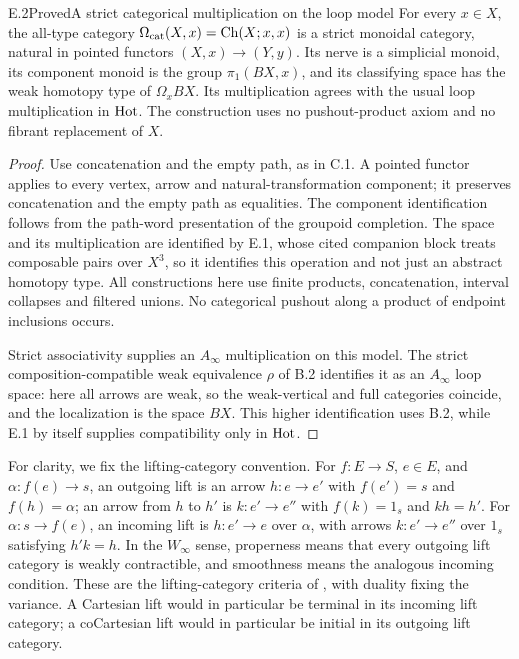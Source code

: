 \begin{result}{E.2}{Proved}{A strict categorical multiplication on the loop model}
For every $x\in X$, the all-type category $\Omega_{\mathrm{cat}}(X,x)=\operatorname{Ch}(X;x,x)$ is a strict monoidal category, natural in pointed functors $(X,x)\to(Y,y)$. Its nerve is a simplicial monoid, its component monoid is the group $\pi_1(BX,x)$, and its classifying space has the weak homotopy type of $\Omega_xBX$. Its multiplication agrees with the usual loop multiplication in $\mathrm{Hot}$. The construction uses no pushout-product axiom and no fibrant replacement of $X$.
\end{result}
\begin{proof}
Use concatenation and the empty path, as in C.1. A pointed functor applies to every vertex, arrow and natural-transformation component; it preserves concatenation and the empty path as equalities. The component identification follows from the path-word presentation of the groupoid completion. The space and its multiplication are identified by E.1, whose cited companion block treats composable pairs over $X^3$, so it identifies this operation and not just an abstract homotopy type. All constructions here use finite products, concatenation, interval collapses and filtered unions. No categorical pushout along a product of endpoint inclusions occurs.

Strict associativity supplies an $A_\infty$ multiplication on this model. The strict composition-compatible weak equivalence $\rho$ of B.2 identifies it as an $A_\infty$ loop space: here all arrows are weak, so the weak-vertical and full categories coincide, and the localization is the space $BX$. This higher identification uses B.2, while E.1 by itself supplies compatibility only in $\mathrm{Hot}$.
\end{proof}

For clarity, we fix the lifting-category convention. For $f:E\to S$, $e\in E$, and $\alpha:f(e)\to s$, an outgoing lift is an arrow $h:e\to e'$ with $f(e')=s$ and $f(h)=\alpha$; an arrow from $h$ to $h'$ is $k:e'\to e''$ with $f(k)=1_s$ and $kh=h'$. For $\alpha:s\to f(e)$, an incoming lift is $h:e'\to e$ over $\alpha$, with arrows $k:e'\to e''$ over $1_s$ satisfying $h'k=h$. In the $W_\infty$ sense, properness means that every outgoing lift category is weakly contractible, and smoothness means the analogous incoming condition. These are the lifting-category criteria of \citet[Definition 1.1 and Theorem 1.2]{Maltsiniotis2005Asphericite}, with duality fixing the variance. A Cartesian lift would in particular be terminal in its incoming lift category; a coCartesian lift would in particular be initial in its outgoing lift category.

